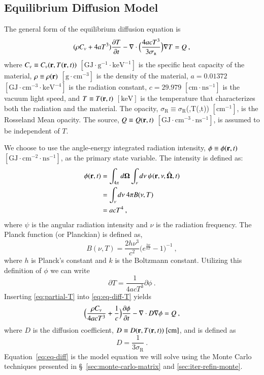 \documentclass[preprint,12pt]{elsarticle}
\newcommand{\Cv}{\ensuremath{C_{v}}}
\newcommand{\ros}{\ensuremath{\sigma_{\scriptscriptstyle\mathrm{R}}}}
\newcommand{\bOmega}{\ensuremath{\mathbf{\Omega}}}
\begin{document}
\subsection{Equilibrium Diffusion Model}

The general form of the equilibrium diffusion equation is \cite{morel_1996}
\begin{equation} 
  (\rho\Cv + 4aT^{3})\pder{T}{t} -
  \nabla\cdot{\Bigl(\frac{4acT^{3}}{3\ros}\Bigr)\grad{T}} = Q\:,
  \label{eq:eq-diff-T}
\end{equation}
where $\Cv\equiv\Cv(\ve{r},T(\ve{r},t))$
$[\text{GJ}\cdot\text{g}^{-1}\cdot\text{keV}^{-1}]$ is the specific heat
capacity of the material, $\rho\equiv\rho(\mathbf{r})$
$[\text{g}\cdot\text{cm}^{-3}]$ is the density of the material, $a=0.01372$
$[\text{GJ}\cdot\text{cm}^{-3}\cdot\text{keV}^{-4}]$ is the radiation
constant, $c=29.979$ $[\text{cm}\cdot\text{ns}^{-1}]$ is the vacuum light
speed, and $T\equiv T(\mathbf{r},t)$ $[\text{keV}]$ is the temperature that
characterizes both the radiation and the material.  The opacity,
$\ros\equiv\ros$(,T(,t)) $[\text{cm}^{-1}]$, is the Rosseland Mean
opacity.  The source, $Q\equiv Q(\mathbf{r},t)$
$[\text{GJ}\cdot\text{cm}^{-3}\cdot\text{ns}^{-1}]$, is assumed to be
independent of $T$.

We choose to use the angle-energy integrated radiation intensity,
$\phi\equiv\phi(\mathbf{r},t)$
$[\text{GJ}\cdot\text{cm}^{-2}\cdot\text{ns}^{-1}]$, as the primary state
variable.  The intensity is defined as:
\begin{equation}
  \label{eq:lte-phi}
  \begin{split}
    \phi(\ve{r},t) &=
    \int_{4\pi}d\bOmega\int_{\nu}d\nu\:\psi(\ve{r},\nu,\hat{\bOmega},t)
    \\ &= \int_{\nu}d\nu\: 4\pi B(\nu,T) \\ &= acT^{4}\:,
  \end{split}
\end{equation}
where $\psi$ is the angular radiation intensity and $\nu$ is the radiation
frequency.  The Planck function (or Planckian) is defined as,
\begin{equation}
  B(\nu,T)=\frac{2h\nu^{3}}{c^{2}}\bigl(e^{\frac{h\nu}{kT}} -
  1\bigr)^{-1}\:,
\end{equation}
where $h$ is Planck's constant and $k$ is the Boltzmann constant.  Utilizing
this definition of $\phi$ we can write
\begin{equation}
  \label{eq:partial-T}
  \partial T = \frac{1}{4acT^{3}}\partial\phi\:.
\end{equation}
Inserting \eqref{eq:partial-T} into \eqref{eq:eq-diff-T} yields
\begin{equation}
  \label{eq:eq-diff}
  \Bigl(\frac{\rho\Cv}{4acT^{3}} + \frac{1}{c}\Bigr)\pder{\phi}{t} -
  \nabla\cdot D\grad{\phi} = Q\:,
\end{equation}
where $D$ is the diffusion coefficient, $D\equiv
D(\mathbf{r},T(\mathbf{r},t))\ [\text{cm}]$, and is defined as
\begin{equation}
  D = \frac{1}{3\ros}\:.
\end{equation}
Equation~\eqref{eq:eq-diff} is the model equation we will solve using the
Monte Carlo techniques presented in \S~\ref{sec:monte-carlo-matrix} and
\ref{sec:iter-refin-monte}.
\end{document}
